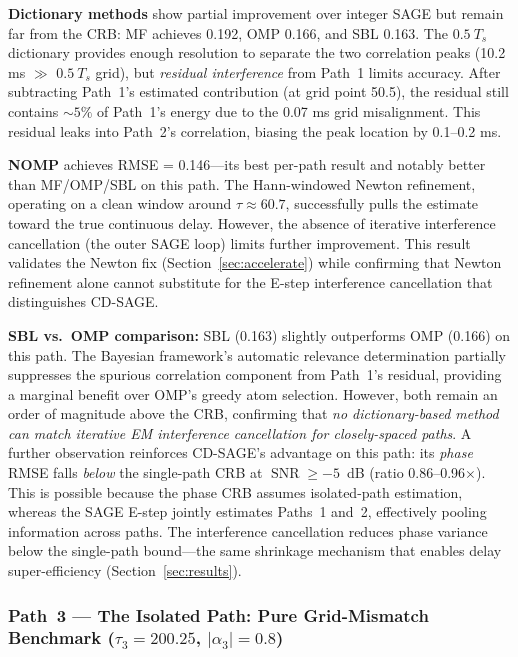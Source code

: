 \documentclass[a4paper,fleqn]{cas-dc}
\DeclareMathOperator{\SNR}{SNR}
\begin{document}
\textbf{Dictionary methods} show partial improvement over integer SAGE but remain far from the CRB: MF achieves 0.192, OMP 0.166, and SBL 0.163. The $0.5\ T_s$ dictionary provides enough resolution to separate the two correlation peaks (10.2 ms $\gg$ $0.5\ T_s$ grid), but \textit{residual interference} from Path~1 limits accuracy. After subtracting Path~1's estimated contribution (at grid point 50.5), the residual still contains $\sim 5\%$ of Path~1's energy due to the 0.07 ms grid misalignment. This residual leaks into Path~2's correlation, biasing the peak location by 0.1--0.2 ms.

\textbf{NOMP} achieves RMSE = 0.146---its best per-path result and notably better than MF/OMP/SBL on this path. The Hann-windowed Newton refinement, operating on a clean window around $\tau \approx 60.7$, successfully pulls the estimate toward the true continuous delay. However, the absence of iterative interference cancellation (the outer SAGE loop) limits further improvement. This result validates the Newton fix (Section~\ref{sec:accelerate}) while confirming that Newton refinement alone cannot substitute for the E-step interference cancellation that distinguishes CD-SAGE.

\textbf{SBL vs.\ OMP comparison:} SBL (0.163) slightly outperforms OMP (0.166) on this path. The Bayesian framework's automatic relevance determination partially suppresses the spurious correlation component from Path~1's residual, providing a marginal benefit over OMP's greedy atom selection. However, both remain an order of magnitude above the CRB, confirming that \textit{no dictionary-based method can match iterative EM interference cancellation for closely-spaced paths}. A further observation reinforces CD-SAGE's advantage on this path: its \textit{phase} RMSE falls \textit{below} the single-path CRB at $\SNR \ge -5$~dB (ratio 0.86--0.96$\times$). This is possible because the phase CRB assumes isolated-path estimation, whereas the SAGE E-step jointly estimates Paths~1 and~2, effectively pooling information across paths. The interference cancellation reduces phase variance below the single-path bound---the same shrinkage mechanism that enables delay super-efficiency (Section~\ref{sec:results}).

\subsubsection{Path~3 --- The Isolated Path: Pure Grid-Mismatch Benchmark ($\tau_3 = 200.25$, $|\alpha_3| = 0.8$)}
\end{document}
